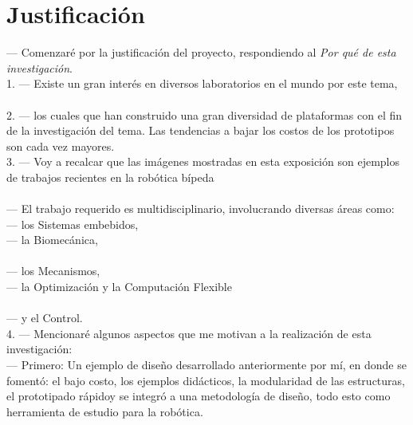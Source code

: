 \documentclass[10pt,letterpaper,oneside,onecolumn]{article}
\newcommand{\nnext}{\quad[\quad$\unrhd$\quad]}
\newcommand{\anext}{\quad[\quad$\rhd$\quad]}
\newcommand{\ngoto}{\quad[\quad$\boxtimes$\quad]}
\newcommand{\bato}{\quad[\quad$\boxdot$\quad]}
\begin{document}
{  \section{Justificaci\'on}
  \label{sec:justificacion}

  --- Comenzar\'e por la justificaci\'on del proyecto, respondiendo al \emph{Por qu\'e de esta investigaci\'on}.\anext{}\\
  1. --- Existe un gran inter\'es en diversos laboratorios en el mundo por este tema,\anext\\
\\
  2. --- los cuales que han construido una gran diversidad de plataformas con el fin de la investigaci\'on del tema. Las tendencias a bajar los costos de los prototipos son cada vez mayores.\anext{}\\
  3. --- Voy a recalcar que las im\'agenes mostradas en esta exposici\'on son ejemplos de trabajos recientes en la rob\'otica b\'ipeda\anext\\
\\
  --- El trabajo requerido es multidisciplinario, involucrando diversas \'areas como:\\
  --- los Sistemas embebidos\ngoto\bato,\\
  --- la Biomec\'anica\ngoto\bato,\\\\
  --- los Mecanismos\ngoto\bato,\\
  --- la Optimizaci\'on y la Computaci\'on Flexible\ngoto\bato\\\\
  --- y el Control.\ngoto\bato\anext{}\\
  4. --- Mencionar\'e algunos aspectos que me motivan a la realizaci\'on de esta investigaci\'on:\anext\\
  --- Primero: Un ejemplo de dise\~no desarrollado anteriormente por m\'i, en donde se foment\'o: el bajo costo\anext, los ejemplos did\'acticos\anext, la modularidad de las estructuras\anext, el prototipado r\'apido\nnext y se integr\'o a una metodolog\'ia de dise\~no, todo esto como herramienta de estudio para la rob\'otica.\anext\\
}
\end{document}
